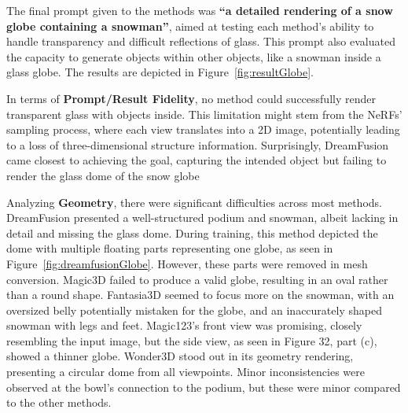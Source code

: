 The final prompt given to the methods was \textbf{``a detailed rendering of a snow globe containing a snowman''}, aimed at testing each method's ability to handle transparency and difficult reflections of glass. This prompt also evaluated the capacity to generate objects within other objects, like a snowman inside a glass globe. The results are depicted in Figure~\ref{fig:resultGlobe}.

In terms of \textbf{Prompt/Result Fidelity}, no method could successfully render transparent glass with objects inside. This limitation might stem from the NeRFs' sampling process, where each view translates into a 2D image, potentially leading to a loss of three-dimensional structure information. Surprisingly, DreamFusion came closest to achieving the goal, capturing the intended object but failing to render the glass dome of the snow globe

Analyzing \textbf{Geometry}, there were significant difficulties across most methods.  DreamFusion presented a well-structured podium and snowman, albeit lacking in detail and missing the glass dome. During training, this method depicted the dome with multiple floating parts representing one globe, as seen in Figure~\ref{fig:dreamfusionGlobe}. However, these parts were removed in mesh conversion. Magic3D failed to produce a valid globe, resulting in an oval rather than a round shape. Fantasia3D seemed to focus more on the snowman, with an oversized belly potentially mistaken for the globe, and an inaccurately shaped snowman with legs and feet. Magic123's front view was promising, closely resembling the input image, but the side view, as seen in Figure 32, part (c), showed a thinner globe. Wonder3D stood out in its geometry rendering, presenting a circular dome from all viewpoints. Minor inconsistencies were observed at the bowl's connection to the podium, but these were minor compared to the other methods.


